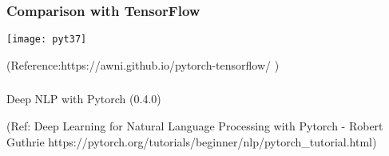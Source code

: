 




\begin{frame}[fragile] \frametitle{Comparison with TensorFlow}
\begin{center}
\texttt{[image: pyt37]}
\end{center}
\tiny{(Reference:https://awni.github.io/pytorch-tensorflow/ )}
\end{frame}

\begin{frame}[fragile]\frametitle{}

\begin{center}
{\Large Deep NLP with Pytorch (0.4.0)}

(Ref: Deep Learning for Natural Language Processing with Pytorch - Robert Guthrie  https://pytorch.org/tutorials/beginner/nlp/pytorch\_tutorial.html)
\end{center}
\end{frame}





